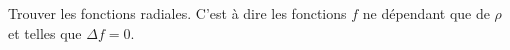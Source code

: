 
\begin{exercice}\label{exoOutilsMath-0082}

    Trouver les fonctions  radiales. C'est à dire les fonctions $f$ ne dépendant que de $\rho$ et telles que $\Delta f=0$.

\end{exercice}
